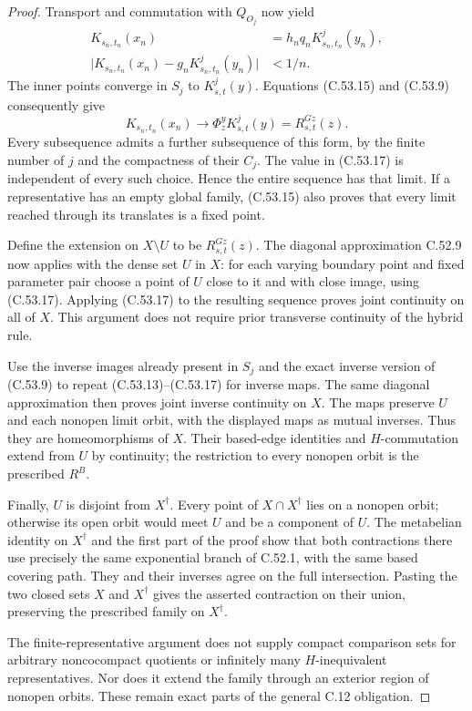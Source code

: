 \begin{proof}
Transport and commutation with $Q_{O_j}$ now yield
\[
 \begin{split}
 K_{s_n,t_n}(x_n)&=h_nq_nK^j_{s_n,t_n}(y_n),\\
 \bigl|K_{s_n,t_n}(x_n)
              -g_nK^j_{s_n,t_n}(y_n)\bigr|&<1/n.
 \end{split}                                            \tag{C.53.16}
\]
The inner points converge in $S_j$ to $K^j_{s,t}(y)$.
Equations (C.53.15) and (C.53.9) consequently give
\[
                   K_{s_n,t_n}(x_n)\longrightarrow
                         \Phi_z^yK^j_{s,t}(y)
                           =R^{Gz}_{s,t}(z).            \tag{C.53.17}
\]
Every subsequence admits a further subsequence of
this form, by the finite number of $j$ and the
compactness of their $C_j$. The value in (C.53.17)
is independent of every such choice. Hence the
entire sequence has that limit. If a representative
has an empty global family, (C.53.15) also proves
that every limit reached through its translates
is a fixed point.

Define the extension on $X\setminus U$ to be
$R^{Gz}_{s,t}(z)$. The diagonal approximation
C.52.9 now applies with the dense set $U$ in $X$:
for each varying boundary point and fixed parameter
pair choose a point of $U$ close to it and with
close image, using (C.53.17). Applying (C.53.17)
to the resulting sequence proves joint continuity
on all of $X$. This argument does not require
prior transverse continuity of the hybrid rule.

Use the inverse images already present in $S_j$
and the exact inverse version of (C.53.9) to
repeat (C.53.13)--(C.53.17) for inverse maps.
The same diagonal approximation then proves
joint inverse continuity on $X$.
The maps preserve $U$ and each nonopen limit
orbit, with the displayed maps as mutual
inverses. Thus they are homeomorphisms of $X$.
Their based-edge identities and $H$-commutation
extend from $U$ by continuity; the restriction
to every nonopen orbit is the prescribed $R^B$.

Finally, $U$ is disjoint from $X^\dagger$.
Every point of $X\cap X^\dagger$ lies on a
nonopen orbit; otherwise its open orbit would
meet $U$ and be a component of $U$.
The metabelian identity on $X^\dagger$ and the
first part of the proof show that both
contractions there use precisely the same
exponential branch of C.52.1, with the same
based covering path. They and their inverses
agree on the full intersection. Pasting the two
closed sets $X$ and $X^\dagger$ gives the
asserted contraction on their union, preserving
the prescribed family on $X^\dagger$.

The finite-representative argument does not
supply compact comparison sets for arbitrary
noncocompact quotients or infinitely many
$H$-inequivalent representatives. Nor does it
extend the family through an exterior region
of nonopen orbits. These remain exact parts
of the general C.12 obligation.
\end{proof}
